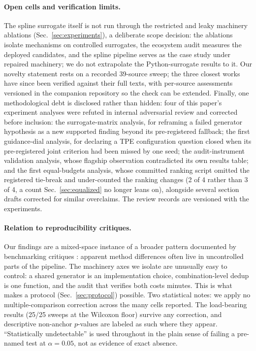 \documentclass[%
 aip,
 amsmath,amssymb,
 floatfix,
 reprint,%
]{revtex4-1}
\begin{document}
\paragraph{Open cells and verification limits.}
The spline surrogate itself is not run through the restricted and leaky
machinery ablations (Sec.~\ref{sec:experiments}), a deliberate scope
decision: the ablations isolate mechanisms on controlled surrogates, the
ecosystem audit measures the deployed candidates, and the spline pipeline
serves as the case study under repaired machinery; we do not extrapolate
the Python-surrogate results to it. Our novelty statement rests on a
recorded 39-source sweep; the three closest works
\cite{dreczkowski2023mcbo,tripp2024diagnosing,daulton2022pr} have since
been verified against their full texts, with per-source assessments
versioned in the companion repository so the check can be extended.
Finally, one methodological debt is disclosed rather than hidden: four of
this paper's experiment analyses were refuted in internal adversarial
review and corrected before inclusion: the surrogate-matrix analysis,
for reframing a failed generator hypothesis as a new supported
finding beyond its pre-registered fallback; the first guidance-dial
analysis, for declaring a TPE configuration question closed when its
pre-registered joint criterion had been missed by one seed; the
audit-instrument validation analysis, whose flagship observation
contradicted its own results table; and the first equal-budgets analysis, whose committed
ranking script omitted the registered tie-break and under-counted the
ranking changes (2 of 4 rather than 3 of 4, a count Sec.~\ref{sec:equalized}
no longer leans on), alongside
several section drafts corrected for similar overclaims. The review
records are versioned with the experiments.

\paragraph{Relation to reproducibility critiques.}
Our findings are a mixed-space instance of a broader pattern documented
by benchmarking critiques \cite{eggensperger2013towards,
turner2021bayesian, dreczkowski2023mcbo, recht2019imagenet}: apparent
method differences
often live in uncontrolled parts of the pipeline. The machinery axes we
isolate are unusually easy to control: a shared generator is an
implementation choice, combination-level dedup is one function, and the
audit that verifies both costs minutes. This is what makes a
protocol (Sec.~\ref{sec:protocol}) possible. Two statistical notes: we apply no multiple-comparison
correction across the many cells reported. The load-bearing results
(25/25 sweeps at the Wilcoxon floor) survive any correction, and
descriptive non-anchor $p$-values are labeled as such where they appear.
``Statistically undetectable'' is used throughout in the plain
sense of failing a pre-named test at $\alpha=0.05$, not as evidence of
exact absence.
\end{document}
